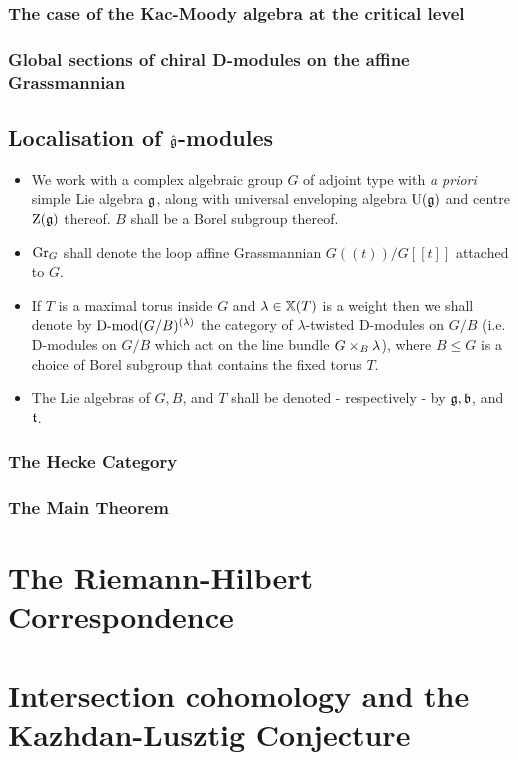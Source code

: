             \subsubsection{The case of the Kac-Moody algebra at the critical level}
            
            \subsubsection{Global sections of chiral D-modules on the affine Grassmannian}
            
        \subsection{Localisation of \texorpdfstring{$\hat{\mathfrak{g}}$}{}-modules}
            \begin{convention} \label{conv: quantum_beilinson_bernstein_localisation_conventions}
                \noindent
                \begin{itemize}
                    \item We work with a complex algebraic group $G$ of adjoint type with \textit{a priori} simple Lie algebra $\mathfrak{g}$, along with universal enveloping algebra $\mathrm{U}(\mathfrak{g})$ and centre $\mathrm{Z}(\mathfrak{g})$ thereof. $B$ shall be a Borel subgroup thereof. 
                    \item $\mathrm{Gr}_G$ shall denote the loop affine Grassmannian $G(\!(t)\!)/G[\![t]\!]$ attached to $G$.
                    \item If $T$ is a maximal torus inside $G$ and $\lambda \in \mathbb{X}(T)$ is a weight then we shall denote by $\mathrm{D}\text{-}\mathrm{mod}(G/B)^{(\lambda)}$ the category of $\lambda$-twisted D-modules on $G/B$ (i.e. D-modules on $G/B$ which act on the line bundle $G \x_B \lambda$), where $B \leq G$ is a choice of Borel subgroup that contains the fixed torus $T$.
                    \item The Lie algebras of $G, B$, and $T$ shall be denoted - respectively - by $\mathfrak{g}, \mathfrak{b}$, and $\mathfrak{t}$.
                \end{itemize}
            \end{convention}
            
            \subsubsection{The Hecke Category}
            
            \subsubsection{The Main Theorem}
            
    \section{The Riemann-Hilbert Correspondence}
    
    \section{Intersection cohomology and the Kazhdan-Lusztig Conjecture}